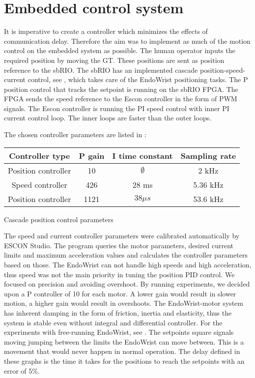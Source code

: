\section{Embedded control system}



It is imperative to create a controller which minimizes the effects of communication delay. Therefore the aim was to implement as much of the motion control on the embedded system as possible. The human operator  inputs the required position by moving the GT. These positions are sent as position reference to the sbRIO. 
The sbRIO has an implemented cascade position-speed-current control, see , which takes care of the EndoWrist positioning tasks. The P position control that tracks the setpoint is running on the sbRIO FPGA. The FPGA sends the speed reference to the Escon controller in the form of PWM signals. The Escon controller is running the PI speed control with inner PI current control loop. The inner loops are faster than the outer loops.

The chosen controller parameters are listed in :

\begin{center}
	\begin{tabular}{ c | c | c | c }
		\hline
		Controller type & P gain & I time constant & Sampling rate \\ \hline
		Position controller & 10 & $\emptyset$ & 2 kHz \\ \hline
		Speed controller & 426 & 28 ms & 5.36 kHz \\ \hline
		Position controller & 1121 & $38 \mu s$ & 53.6 kHz \\ \hline
	\end{tabular}
	\caption{Cascade position control parameters}
	\label{tab:control_param}
\end{center}

The speed and current controller parameters were calibrated automatically by ESCON Studio. The program queries the motor parameters, desired current limits and maximum acceleration values and calculates the controller parameters based on those. The EndoWrist can not handle high speeds and high acceleration, thus speed was not the main priority in tuning the position PID control. We focused on precision and avoiding overshoot. By running experiments, we decided upon a P controller of 10 for each motor. A lower gain would result in slower motion, a higher gain would result in overshoots. The EndoWrist-motor system has inherent damping in the form of friction, inertia and elasticity, thus the system is stable even without integral and differential controller. For the experiments with free-running EndoWrist, see . The setpoints square signals moving jumping between the limits the EndoWrist can move between. This is a movement that would never happen in normal operation. The delay defined in these graphs is the time it takes for the positions to reach the setpoints with an error of 5\%.

